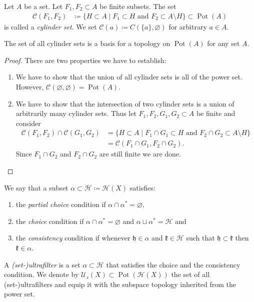 \begin{defin}
  \label{def:pot-top}
  Let \(A\) be a set. Let \(F_1, F_2 \subset A\) be finite subsets. The set
  \begin{align*}
    \mathcal{C}(F_1, F_2) & \coloneqq \{ H \subset A \mid F_1 \subset H \text{ and } F_2 \subset A \setminus H\} \subset \operatorname{Pot}(A)
  \end{align*}
  is called a \emph{cylinder set}. We set \(\mathcal{C}(a) \coloneqq C(\{a\}, \varnothing)\) for arbitrary \(a \in A\).
\end{defin}

\begin{prop}
  \label{prop:pot-top}
  The set of all cylinder sets is a basis for a topology on \(\operatorname{Pot}(A)\) for any set \(A\).
\end{prop}

\begin{proof}
  There are two properties we have to establish:
  \begin{enumerate}
  \item We have to show that the union of all cylinder sets is all of the power set. However, \(\mathcal{C}(\varnothing, \varnothing) = \operatorname{Pot}(A)\).
  \item We have to show that the intersection of two cylinder sets is a union of arbitrarily many cylinder sets. Thus let \(F_1, F_2, G_1, G_2 \subset A\) be finite and consider
  \begin{align*}
    \mathcal{C}(F_1, F_2) \cap \mathcal{C}(G_1, G_2)
    & = \{H \subset A \mid F_1 \cap G_1 \subset H \text{ and } F_2 \cap G_2 \subset A \setminus H\}\\
    & = \mathcal{C}(F_1 \cap G_1, F_2 \cap G_2).
  \end{align*}
  Since \(F_1 \cap G_2\) and \(F_2 \cap G_2\) are still finite we are done.
  \end{enumerate}
\end{proof}

\begin{defin}
  We say that a subset \(\alpha \subset \mathcal{H} \coloneqq \mathcal{H}(X)\) satisfies:
  \begin{enumerate}
  \item the \emph{partial choice} condition if \(\alpha \cap \alpha^\ast = \varnothing\),
  \item the \emph{choice} condition if \(\alpha \cap \alpha^\ast = \varnothing\) and \(\alpha \sqcup \alpha^\ast = \mathcal{H}\) and
  \item the \emph{consistency} condition if whenever \(\mathfrak{h} \in \alpha\) and \(\mathfrak{k} \in \mathcal{H}\) such that \(\mathfrak{h} \subset \mathfrak{k}\) then \(\mathfrak{k} \in \alpha\).
  \end{enumerate}
  A \emph{(set-)ultrafilter} is a set \(\alpha \subset \mathcal{H}\) that satisfies the choice and the consistency condition. We denote by \(\mathcal{U}_s(X) \subset \operatorname{Pot}(\mathcal{H}(X))\) the set of all (set-)ultrafilters and equip it with the subspace topology inherited from the power set.
\end{defin}

